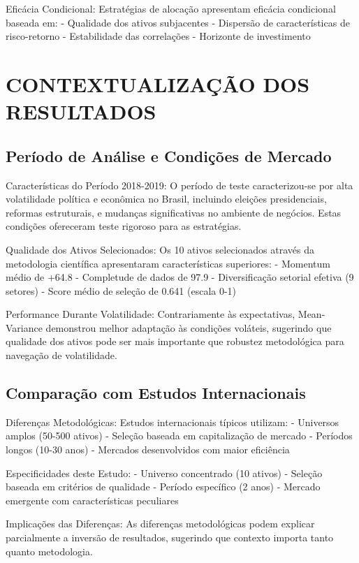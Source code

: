 Eficácia Condicional: Estratégias de alocação apresentam eficácia condicional baseada em:
- Qualidade dos ativos subjacentes
- Dispersão de características de risco-retorno
- Estabilidade das correlações
- Horizonte de investimento

\section{CONTEXTUALIZAÇÃO DOS RESULTADOS}

\subsection{Período de Análise e Condições de Mercado}

Características do Período 2018-2019: O período de teste caracterizou-se por alta volatilidade política e econômica no Brasil, incluindo eleições presidenciais, reformas estruturais, e mudanças significativas no ambiente de negócios. Estas condições ofereceram teste rigoroso para as estratégias.

Qualidade dos Ativos Selecionados: Os 10 ativos selecionados através da metodologia científica apresentaram características superiores:
- Momentum médio de +64.8%
- Completude de dados de 97.9%
- Diversificação setorial efetiva (9 setores)
- Score médio de seleção de 0.641 (escala 0-1)

Performance Durante Volatilidade: Contrariamente às expectativas, Mean-Variance demonstrou melhor adaptação às condições voláteis, sugerindo que qualidade dos ativos pode ser mais importante que robustez metodológica para navegação de volatilidade.

\subsection{Comparação com Estudos Internacionais}

Diferenças Metodológicas: Estudos internacionais típicos utilizam:
- Universos amplos (50-500 ativos)
- Seleção baseada em capitalização de mercado
- Períodos longos (10-30 anos)
- Mercados desenvolvidos com maior eficiência

Especificidades deste Estudo:
- Universo concentrado (10 ativos)
- Seleção baseada em critérios de qualidade
- Período específico (2 anos)
- Mercado emergente com características peculiares

Implicações das Diferenças: As diferenças metodológicas podem explicar parcialmente a inversão de resultados, sugerindo que contexto importa tanto quanto metodologia.

